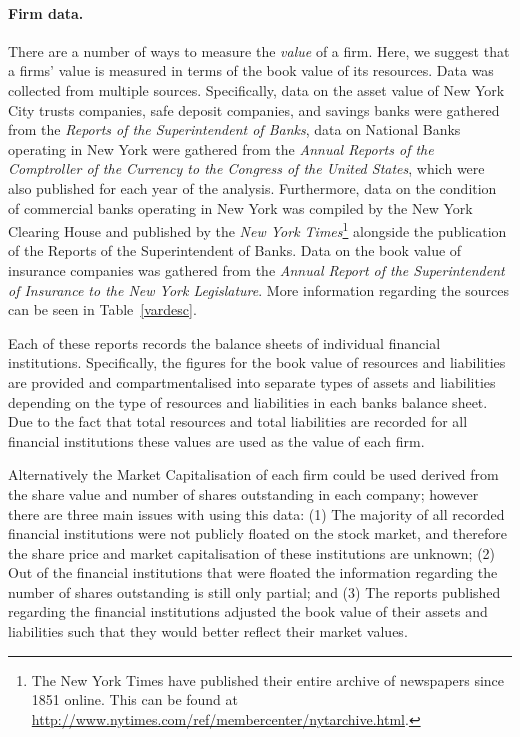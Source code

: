 \documentclass[11pt,fleqn]{article}
\begin{document}
\paragraph{Firm data.}

There are a number of ways to measure the \emph{value} of a firm. Here, we suggest that a firms' value is measured in terms of the book value of its resources. Data was collected from multiple sources. Specifically, data on the asset value of New York City trusts companies, safe deposit companies, and savings banks were gathered from the \emph{Reports of the Superintendent of Banks}, data on National Banks operating in New York were gathered from the \emph{Annual Reports of the Comptroller of the Currency to the Congress of the United States}, which were also published for each year of the analysis. Furthermore, data on the condition of commercial banks operating in New York was compiled by the New York Clearing House and published by the \emph{New York Times}\footnote{The New York Times have published their entire archive of newspapers since 1851 online. This can be found at \href{http://www.nytimes.com/ref/membercenter/nytarchive.html}{http://www.nytimes.com/ref/membercenter/nytarchive.html}.} alongside the publication of the Reports of the Superintendent of Banks. Data on the book value of insurance companies was gathered from the \emph{Annual Report of the Superintendent of Insurance to the New York Legislature}. More information regarding the sources can be seen in Table~\ref{vardesc}.

Each of these reports records the balance sheets of individual financial institutions. Specifically, the figures for the book value of resources and liabilities are provided and compartmentalised into separate types of assets and liabilities depending on the type of resources and liabilities in each banks balance sheet. Due to the fact that total resources and total liabilities are recorded for all financial institutions these values are used as the value of each firm.

Alternatively the Market Capitalisation of each firm could be used derived from the share value and number of shares outstanding in each company; however there are three main issues with using this data: (1) The majority of all recorded financial institutions were not publicly floated on the stock market, and therefore the share price and market capitalisation of these institutions are unknown; (2) Out of the financial institutions that were floated the information regarding the number of shares outstanding is still only partial; and (3) The reports published regarding the financial institutions adjusted the book value of their assets and liabilities such that they would better reflect their market values.
\end{document}

